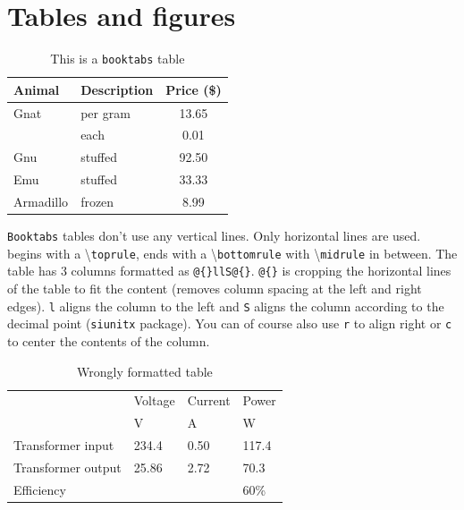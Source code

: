 \section{Tables and figures}

\begin{table}[H]
\centering
\caption{This is a \texttt{booktabs} table}
\label{tab:tableExample}
\begin{tabular}{@{}llS@{}}
\toprule
Animal     & Description & {Price (\$)} \\ \midrule
Gnat       & per gram    & 13.65      \\
           & each        & 0.01       \\
Gnu        & stuffed     & 92.50      \\
Emu        & stuffed     & 33.33      \\
Armadillo  & frozen      & 8.99       \\ \bottomrule
\end{tabular}
\end{table}
\texttt{Booktabs} tables don't use any vertical lines. Only horizontal lines are used.  begins with a \textbackslash \texttt{toprule}, ends with a \textbackslash \texttt{bottomrule} with \textbackslash \texttt{midrule} in between. The table has 3 columns formatted as \texttt{@\{\}llS@\{\}}. \texttt{@\{\}} is cropping the horizontal lines of the table to fit the content (removes column spacing at the left and right edges). \texttt{l} aligns the column to the left and \texttt{S} aligns the column according to the decimal point (\texttt{siunitx} package). You can of course also use \texttt{r} to align right or \texttt{c} to center the contents of the column.

\begin{table}[H]
\centering
\caption{Wrongly formatted table}
\label{tab:tableExampleWrong}
\begin{tabular}{llll}
\toprule
                    & Voltage & Current   & Power   \\
                    & V       & A         & W       \\ \midrule
Transformer input   & 234.4   & 0.50      & 117.4   \\ \midrule
Transformer output  & 25.86   & 2.72      & 70.3    \\ \midrule
Efficiency          &         &           & 60\%    \\ \bottomrule
\end{tabular}
\end{table}

